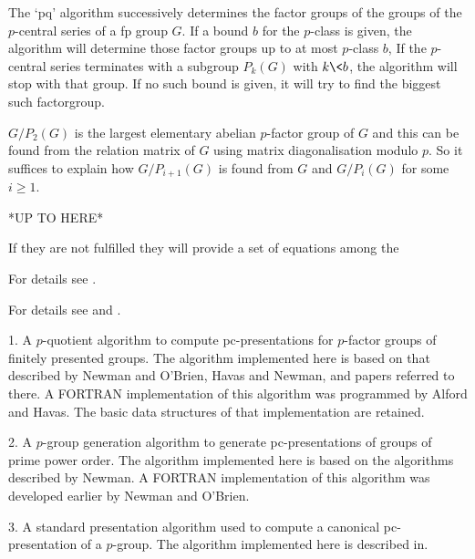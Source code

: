 The `pq'  algorithm successively determines  the factor groups  of the
groups of the $p$-central series of a fp group $G$. If a bound $b$ for
the  $p$-class is  given, the  algorithm will  determine  those factor
groups  up  to  at  most  $p$-class $b$,  If  the  $p$-central  series
terminates with a subgroup $P_k(G)$  with $k \< b$, the algorithm will
stop with that group.  If no such  bound is given, it will try to find
the biggest such factorgroup.

$G/P_2(G)$ is  the largest elementary abelian $p$-factor  group of $G$
and this  can be found  from the relation  matrix of $G$  using matrix
diagonalisation   modulo  $p$.   So   it  suffices   to  explain   how
$G/P_{i+1}(G)$ is found from $G$ and $G/P_i(G)$ for some $i \ge 1$.


*UP TO HERE*

If they are  not fulfilled they will provide a  set of equations among
the 


For details see \cite{OBr94}.



For details see \cite{New77} and \cite{OBr90}.



\beginlist

\item{1.}
A $p$-quotient  algorithm  to  compute  pc-presentations  for  $p$-factor
groups of finitely presented groups. The algorithm  implemented  here  is
based on that described by Newman  and  O'Brien,  Havas  and
Newman, and papers referred to there. 
A FORTRAN implementation of this algorithm was programmed by  Alford  and
Havas. The basic data structures of that implementation are retained.

\item{2.} 
A $p$-group generation algorithm to generate pc-presentations  of  groups
of prime power order. The algorithm implemented  here  is  based  on  the
algorithms described by Newman.  A
FORTRAN implementation of this algorithm was developed earlier by  Newman
and O'Brien.

\item{3.}
A  standard  presentation  algorithm  used   to   compute   a   canonical
pc-presentation  of  a  $p$-group.  The  algorithm  implemented  here  is
described in.

